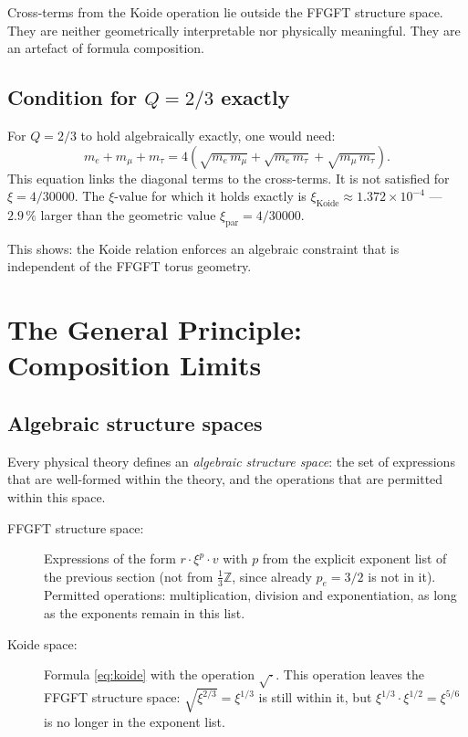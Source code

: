 \begin{keypoint}
Cross-terms from the Koide operation lie outside the FFGFT structure space.
They are neither geometrically interpretable nor physically meaningful.
They are an artefact of formula composition.
\end{keypoint}

\subsection{Condition for $Q = 2/3$ exactly}

For $Q = 2/3$ to hold algebraically exactly, one would need:
\begin{equation}
  m_e + m_\mu + m_\tau = 4\left(\sqrt{m_e\,m_\mu} + \sqrt{m_e\,m_\tau} + \sqrt{m_\mu\,m_\tau}\right).
  \label{eq:condition}
\end{equation}
This equation links the diagonal terms to the cross-terms.
It is not satisfied for $\xi = 4/30000$. The $\xi$-value for which it holds
exactly is $\xi_{\text{Koide}} \approx 1{.}372 \times 10^{-4}$ —
$2{.}9\,\%$ larger than the geometric value $\xi_{\text{par}} = 4/30000$.

This shows: the Koide relation enforces an algebraic constraint
that is independent of the FFGFT torus geometry.

\section{The General Principle: Composition Limits}

\subsection{Algebraic structure spaces}

Every physical theory defines an \emph{algebraic structure space}:
the set of expressions that are well-formed within the theory, and the
operations that are permitted within this space.

\begin{description}
  \item[FFGFT structure space:] Expressions of the form $r \cdot \xi^{p} \cdot v$
    with $p$ from the explicit exponent list of the previous section
    (not from $\frac{1}{3}\mathbb{Z}$, since already $p_e = 3/2$ is not in it).
    Permitted operations: multiplication, division and exponentiation, as long
    as the exponents remain in this list.
  \item[Koide space:] Formula \eqref{eq:koide} with the operation
    $\sqrt{\cdot}$. This operation leaves the FFGFT structure space:
    $\sqrt{\xi^{2/3}} = \xi^{1/3}$ is still within it,
    but $\xi^{1/3} \cdot \xi^{1/2} = \xi^{5/6}$ is no longer in the exponent list.
\end{description}

